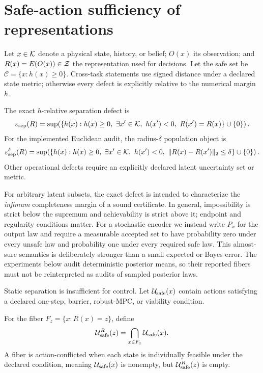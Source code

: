 \section{Safe-action sufficiency of representations}

Let $x\in\mathcal{K}$ denote a physical state, history, or belief; $O(x)$ its observation; and
$R(x)=E(O(x))\in\mathcal{Z}$ the representation used for decisions.  Let the safe set be
$\mathcal C=\{x:h(x)\geq 0\}$.  Cross-task statements use signed distance under a declared state
metric; otherwise every defect is explicitly relative to the numerical margin $h$.

\begin{definition}
The exact $h$-relative separation defect is
\[
  \varepsilon_{\mathrm{sep}}(R)=\sup\!\left(\{h(x):h(x)\geq0,\ \exists x'\in\mathcal{K},\ h(x')<0,
  \ R(x')=R(x)\}\cup\{0\}\right).
\]
For the implemented Euclidean audit, the radius-$\delta$ population object is
\[
  \epssep^\delta(R)=\sup\!\left(\{h(x):h(x)\geq0,\ \exists x'\in\K,\ h(x')<0,
  \ \|R(x)-R(x')\|_2\leq\delta\}\cup\{0\}\right).
\]
Other operational defects require an explicitly declared latent uncertainty set or metric.
\end{definition}

For arbitrary latent subsets, the exact defect is intended to characterize the \emph{infimum}
completeness margin of a sound certificate.  In general, impossibility is strict below the
supremum and achievability is strict above it; endpoint and regularity conditions matter.
For a stochastic encoder we instead write $P_x$ for the output law and require a measurable
accepted set to have probability zero under every unsafe law and probability one under every
required safe law.  This almost-sure semantics is deliberately stronger than a small expected or
Bayes error.  The experiments below audit deterministic posterior means, so their reported fibers
must not be reinterpreted as audits of sampled posterior laws.

Static separation is insufficient for control.  Let $\mathcal{U}_{\mathrm{safe}}(x)$ contain actions satisfying a
declared one-step, barrier, robust-MPC, or viability condition.

\begin{definition}
For the fiber $F_z=\{x:R(x)=z\}$, define
\[
  \mathcal{U}_{\mathrm{safe}}^R(z)=\bigcap_{x\in F_z}\mathcal{U}_{\mathrm{safe}}(x).
\]
A fiber is action-conflicted when each state is individually feasible under the declared condition,
meaning $\mathcal{U}_{\mathrm{safe}}(x)$ is nonempty, but $\mathcal{U}_{\mathrm{safe}}^R(z)$ is empty.
\end{definition}

